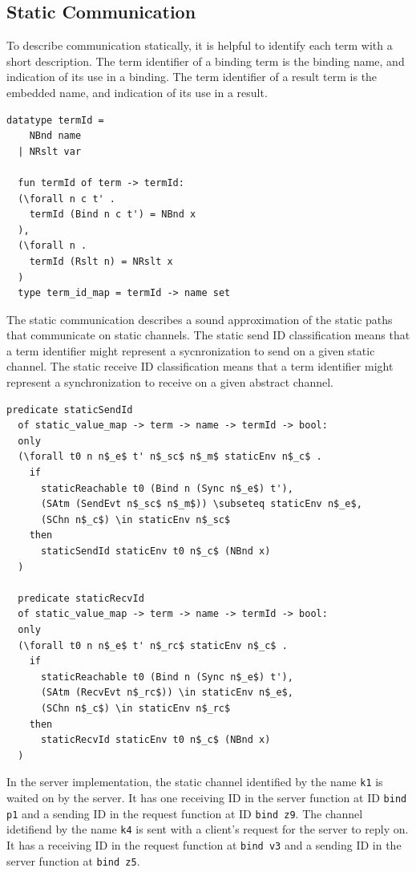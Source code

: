 \documentclass[10pt]{article}
\begin{document}
\subsection{Static Communication}
To describe communication statically, it is helpful to identify each term with a short description.
The term identifier of a binding term is the binding name, and indication of its use in a binding.
The term identifier of a result term is the embedded name, and indication of its use in a result.

\begin{lstlisting}[language=logic, mathescape]
  datatype termId =
    NBnd name
  | NRslt var

  fun termId of term -> termId:
  (\forall n c t' . 
    termId (Bind n c t') = NBnd x
  ),
  (\forall n . 
    termId (Rslt n) = NRslt x
  )
  type term_id_map = termId -> name set
\end{lstlisting}

The static communication describes a sound approximation of
the static paths that communicate on static channels.
The static send ID classification means that a term identifier might represent a
sycnronization to send on a given static channel.
The static receive ID classification means that a term identifier might represent a
synchronization to receive on a given abstract channel. 

\begin{lstlisting}[language=logic, mathescape]
  predicate staticSendId
  of static_value_map -> term -> name -> termId -> bool:
  only
  (\forall t0 n n$_e$ t' n$_sc$ n$_m$ staticEnv n$_c$ .
    if
      staticReachable t0 (Bind n (Sync n$_e$) t'),
      (SAtm (SendEvt n$_sc$ n$_m$)) \subseteq staticEnv n$_e$, 
      (SChn n$_c$) \in staticEnv n$_sc$
    then
      staticSendId staticEnv t0 n$_c$ (NBnd x)
  )

  predicate staticRecvId
  of static_value_map -> term -> name -> termId -> bool:
  only
  (\forall t0 n n$_e$ t' n$_rc$ staticEnv n$_c$ .
    if
      staticReachable t0 (Bind n (Sync n$_e$) t'),
      (SAtm (RecvEvt n$_rc$)) \in staticEnv n$_e$, 
      (SChn n$_c$) \in staticEnv n$_rc$ 
    then
      staticRecvId staticEnv t0 n$_c$ (NBnd x)
  )
\end{lstlisting}


In the server implementation,
the static channel identified by the name \lstinline{k1} is waited on
by the server.  It has one receiving ID in the server function
at ID \lstinline[language=sugar_lang]{bind p1} and a sending ID
in the request function at ID \lstinline[language=sugar_lang]{bind z9}.
The channel idetifiend by the name \lstinline{k4} is sent with a client's request for
the server to reply on. It has a receiving ID in the request function at
\lstinline[language=sugar_lang]{bind v3} and a sending ID in the server function at
\lstinline[language=sugar_lang]{bind z5}.
\end{document}
